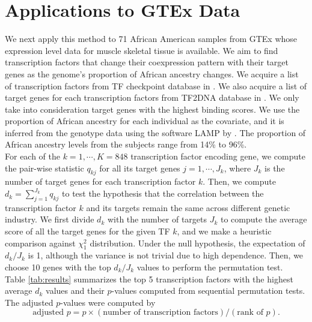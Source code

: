 \documentclass[aoas,authoryear, preprint]{imsart}
\numberwithin{equation}{section}
\theoremstyle{plain}
\begin{document}
\section{Applications to GTEx Data} \label{sec:applications}
We next apply this method to 71 African American samples from GTEx \cite{gtex2015genotype} whose expression level data for muscle skeletal tissue is available. We aim to find transcription factors that change their coexpression pattern with their target genes as the genome's proportion of African ancestry changes. We acquire a list of transcription factors from TF checkpoint database  in \cite{chawla2013tfcheckpoint}. We also acquire a list of target genes for each transcription factors from TF2DNA database in \cite{pujato2014prediction}. We only take into consideration target genes with the highest binding scores. We use the proportion of African ancestry for each individual as the covariate, and it is inferred from the genotype data using the software LAMP  by \cite{pacsaniuc2009imputation}. The proportion of African ancestry levels from the subjects range from 14\% to 96\%.\\ 

For each of the $k = 1, \cdots, K = 848$ transcription factor encoding gene, we compute the pair-wise statistic $q_{kj}$ for all its target genes $j = 1, \cdots, J_k$, where $J_k$ is the number of target genes for each transcription factor $k$. Then, we compute $d_k = \sum_{j=1}^{J_k} q_{kj}$ to test the hypothesis that the correlation between the transcription factor $k$ and its targets remain the same across different genetic industry. We first divide $d_k$ with the number of targets $J_k$ to compute the average score of all the target genes for the given TF $k$, and we make a heuristic comparison against $\chi_1^2$ distribution. Under the null hypothesis, the expectation of $d_k/J_k$ is 1, although the variance is not trivial due to high dependence. Then, we choose 10 genes with the top $d_{k}/J_k$ values to perform the permutation test. \\

Table \ref{tab:results} summarizes the top 5 transcription factors with the highest average $d_k$ values and their $p$-values computed from sequential permutation tests. The adjusted $p$-values were computed by
$$\text{adjusted } p = p \times (\text{number of transcription factors}) / (\text{rank of $p$}).$$
\end{document}
